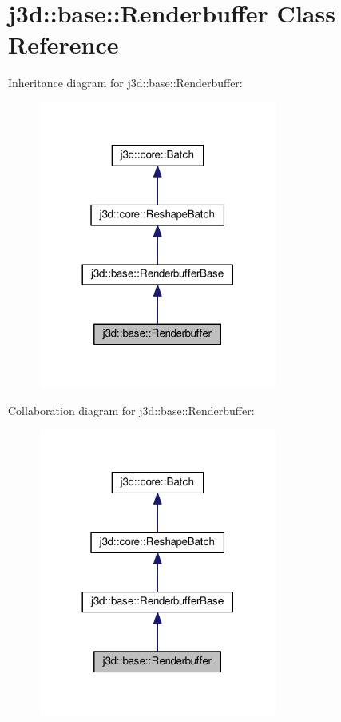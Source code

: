 \hypertarget{classj3d_1_1base_1_1Renderbuffer}{}\section{j3d\+:\+:base\+:\+:Renderbuffer Class Reference}
\label{classj3d_1_1base_1_1Renderbuffer}


Inheritance diagram for j3d\+:\+:base\+:\+:Renderbuffer\+:
\nopagebreak
\begin{figure}[H]
\begin{center}
\leavevmode
\includegraphics[width=221pt]{classj3d_1_1base_1_1Renderbuffer__inherit__graph}
\end{center}
\end{figure}


Collaboration diagram for j3d\+:\+:base\+:\+:Renderbuffer\+:
\nopagebreak
\begin{figure}[H]
\begin{center}
\leavevmode
\includegraphics[width=221pt]{classj3d_1_1base_1_1Renderbuffer__coll__graph}
\end{center}
\end{figure}

